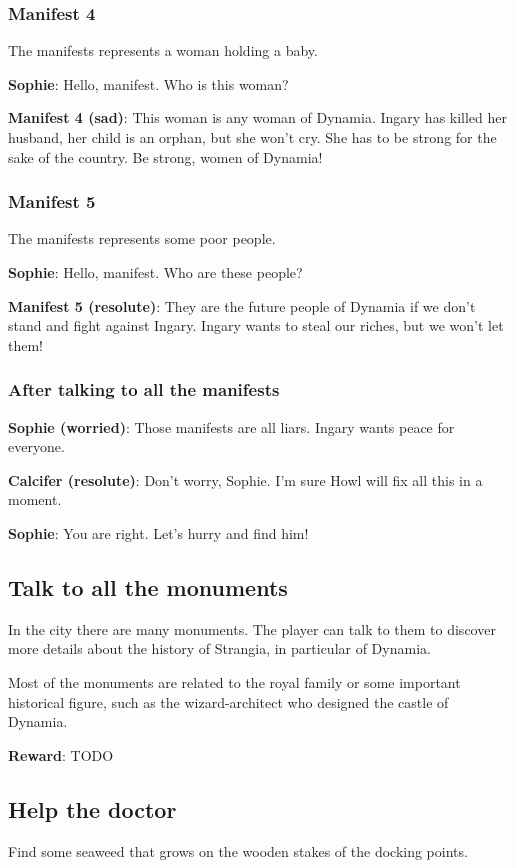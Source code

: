 \subsubsection*{Manifest 4}
The manifests represents a woman holding a baby.

\textbf{Sophie}: Hello, manifest. Who is this woman?

\textbf{Manifest 4 (sad)}: This woman is any woman of Dynamia. Ingary has killed her husband, her child is an orphan, but she won't cry. She has to be strong for the sake of the country. Be strong, women of Dynamia!

\subsubsection*{Manifest 5}
The manifests represents some poor people.

\textbf{Sophie}: Hello, manifest. Who are these people?

\textbf{Manifest 5 (resolute)}: They are the future people of Dynamia if we don't stand and fight against Ingary. Ingary wants to steal our riches, but we won't let them!

\subsubsection*{After talking to all the manifests}
\textbf{Sophie (worried)}: Those manifests are all liars. Ingary wants peace for everyone.

\textbf{Calcifer (resolute)}: Don't worry, Sophie. I'm sure Howl will fix all this in a moment.

\textbf{Sophie}: You are right. Let's hurry and find him!


\subsection{Talk to all the monuments}
In the city there are many monuments. The player can talk to them to discover more details about the history of Strangia, in particular of Dynamia.

Most of the monuments are related to the royal family or some important historical figure, such as the wizard-architect who designed the castle of Dynamia.

\textbf{Reward}: TODO


\subsection{Help the doctor}
Find some seaweed that grows on the wooden stakes of the docking points.


